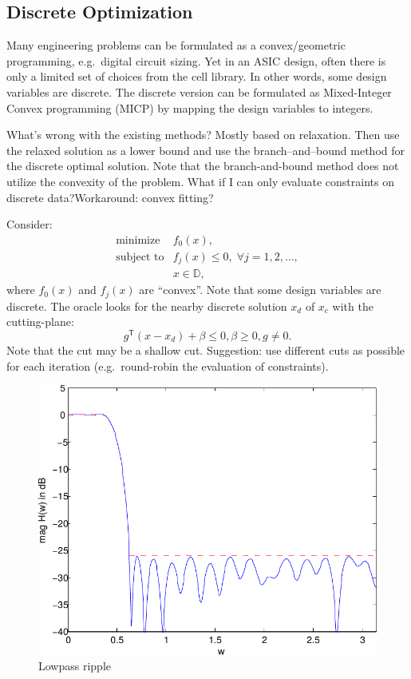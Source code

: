 \documentclass[final,leqno]{siamltex}
\begin{document}
\hypertarget{sec:discrete-optimization}{%
\subsection{Discrete Optimization}\label{sec:discrete-optimization}}

Many engineering problems can be formulated as a convex/geometric programming, e.g.~digital circuit sizing. Yet in an ASIC design, often there is only a limited set of choices from the cell library. In other words, some design variables are discrete. The discrete version can be formulated as Mixed-Integer Convex programming (MICP) by mapping the design variables to integers.

What's wrong with the existing methods? Mostly based on relaxation. Then use the relaxed solution as a lower bound and use the branch--and--bound method for the discrete optimal solution. Note that the branch-and-bound method does not utilize the convexity of the problem. What if I can only evaluate constraints on discrete data?Workaround: convex fitting?

Consider:
\[\begin{array}{ll}
        \text{minimize}      & f_0(x), \\
        \text{subject to}    & f_j(x) \leq 0, \; \forall j=1,2,\ldots, \\
                             & x \in \mathbb{D},
  \end{array}
\]
where \(f_0(x)\) and \(f_j(x)\) are ``convex''. Note that some design variables are discrete. The oracle looks for the nearby discrete solution \(x_d\) of \(x_c\) with the cutting-plane:
\[ g^\mathsf{T} (x - x_d) + \beta \leq 0, \beta \geq 0, g \neq 0.
\]
Note that the cut may be a shallow cut. Suggestion: use different cuts as possible for each iteration (e.g.~round-robin the evaluation of constraints).

\begin{figure}
\hypertarget{fig:lowpass_ripple}{%
\centering
\includegraphics{ellipsoid.files/lowpass_ripple.pdf}
\caption{Lowpass ripple}\label{fig:lowpass_ripple}
}
\end{figure}

\renewcommand\refname{References}

\end{document}
